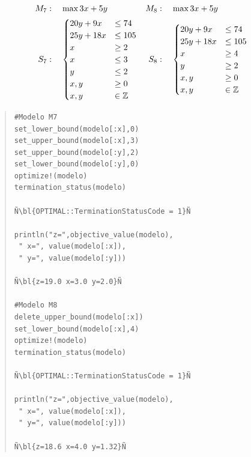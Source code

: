     \begin{minipage}{0.4\textwidth}
    	\begin{align*}
    	M_7&:\quad 	\max 3x+5y & M_8&:\quad 	\max 3x+5y\\ 
    	S_7&:\quad \begin{cases}
    	20y+9x&\leq 74\\
    	25y+18x&\leq 105\\
    	x&\geq 2\\
    	x&\leq 3\\
    	y&\leq 2\\
    	x,y&\geq 0\\
    	x,y&\in \mathbb Z\end{cases}&S_8&:\quad \begin{cases}
    	20y+9x&\leq 74\\
    	25y+18x&\leq 105\\
    	x&\geq 4\\
    	y&\geq 2\\
    	x,y&\geq 0\\
    	x,y&\in \mathbb Z\end{cases}
    	\end{align*}
    \end{minipage}		
    \begin{minipage}{0.6\textwidth}
    	\begin{quote}
    		\begin{lstlisting}[escapechar=Ñ]
#Modelo M7
set_lower_bound(modelo[:x],0)
set_upper_bound(modelo[:x],3)
set_upper_bound(modelo[:y],2) 
set_lower_bound(modelo[:y],0)
optimize!(modelo)
termination_status(modelo)

Ñ\bl{OPTIMAL::TerminationStatusCode = 1}Ñ

println("z=",objective_value(modelo),
 " x=", value(modelo[:x]),
 " y=", value(modelo[:y]))

Ñ\bl{z=19.0 x=3.0 y=2.0}Ñ

#Modelo M8
delete_upper_bound(modelo[:x])
set_lower_bound(modelo[:x],4)
optimize!(modelo)
termination_status(modelo)

Ñ\bl{OPTIMAL::TerminationStatusCode = 1}Ñ

println("z=",objective_value(modelo),
 " x=", value(modelo[:x]),
 " y=", value(modelo[:y]))
 
Ñ\bl{z=18.6 x=4.0 y=1.32}Ñ
    		\end{lstlisting}
    	\end{quote}
    \end{minipage}
    
